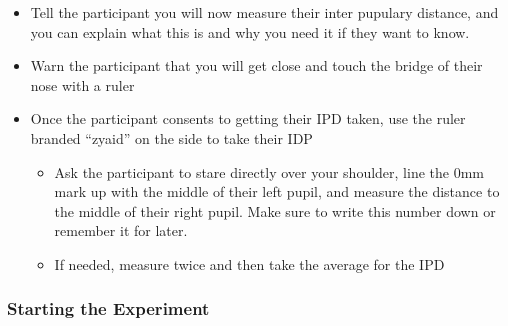\documentclass[
]{article}
\providecommand{\tightlist}{%
  \setlength{\itemsep}{0pt}\setlength{\parskip}{0pt}}
\begin{document}
\begin{itemize}
\tightlist
\item
  Tell the participant you will now measure their inter pupulary
  distance, and you can explain what this is and why you need it if they
  want to know.
\item
  Warn the participant that you will get close and touch the bridge of
  their nose with a ruler
\item
  Once the participant consents to getting their IPD taken, use the
  ruler branded ``zyaid'' on the side to take their IDP

  \begin{itemize}
  \tightlist
  \item
    Ask the participant to stare directly over your shoulder, line the
    0mm mark up with the middle of their left pupil, and measure the
    distance to the middle of their right pupil. Make sure to write this
    number down or remember it for later.
  \item
    If needed, measure twice and then take the average for the IPD
  \end{itemize}
\end{itemize}

\hypertarget{starting-the-experiment}{%
\subsubsection{Starting the Experiment}\label{starting-the-experiment}}
\end{document}
